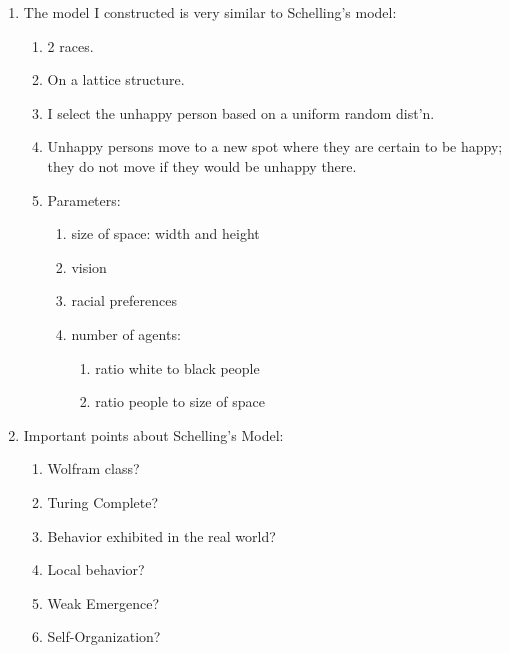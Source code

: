 \documentclass[11pt]{article}
\begin{document}
\begin{enumerate}
\begin{enumerate}
\begin{enumerate}
\begin{enumerate}
                                \end{enumerate}
                        \end{enumerate}
                \end{enumerate}
            \item The model I constructed is very similar to Schelling's model:
                \begin{enumerate}
                    \item 2 races.
                    \item On a lattice structure.
                    \item I select the unhappy person based on a uniform random dist'n.
                    \item Unhappy persons move to a new spot where they are certain to be happy; they do not move if they would be unhappy there.
                    \item Parameters:
                        \begin{enumerate}
                            \item size of space: width and height
                            \item vision
                            \item racial preferences
                            \item number of agents:
                                \begin{enumerate}
                                    \item ratio white to black people
                                    \item ratio people to size of space
                                \end{enumerate}
                        \end{enumerate}
                \end{enumerate}
            \item Important points about Schelling's Model:
                \begin{enumerate}
                    \item Wolfram class?
                    \item Turing Complete?
                    \item Behavior exhibited in the real world?
                    \item Local behavior?
                    \item Weak Emergence?
                    \item Self-Organization?
                \end{enumerate}
        \end{enumerate}
\end{document}
